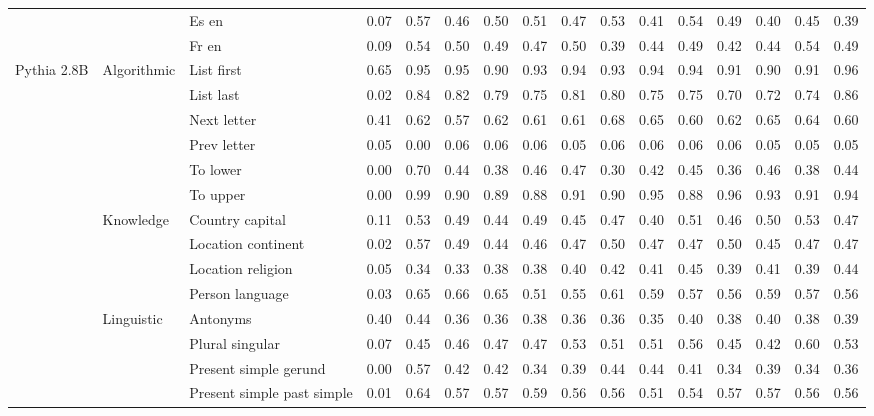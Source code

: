 \begin{center}
\begin{longtable}{lllrrrrrrrrrrrrr}
 &  & Es en & 0.07 & 0.57 & 0.46 & 0.50 & 0.51 & 0.47 & 0.53 & 0.41 & 0.54 & 0.49 & 0.40 & 0.45 & 0.39 \\
 &  & Fr en & 0.09 & 0.54 & 0.50 & 0.49 & 0.47 & 0.50 & 0.39 & 0.44 & 0.49 & 0.42 & 0.44 & 0.54 & 0.49 \\
\cline{1-16} \cline{2-16}
\multirow[t]{18}{*}{Pythia 2.8B} & \multirow[t]{6}{*}{Algorithmic} & List first & 0.65 & 0.95 & 0.95 & 0.90 & 0.93 & 0.94 & 0.93 & 0.94 & 0.94 & 0.91 & 0.90 & 0.91 & 0.96 \\
 &  & List last & 0.02 & 0.84 & 0.82 & 0.79 & 0.75 & 0.81 & 0.80 & 0.75 & 0.75 & 0.70 & 0.72 & 0.74 & 0.86 \\
 &  & Next letter & 0.41 & 0.62 & 0.57 & 0.62 & 0.61 & 0.61 & 0.68 & 0.65 & 0.60 & 0.62 & 0.65 & 0.64 & 0.60 \\
 &  & Prev letter & 0.05 & 0.00 & 0.06 & 0.06 & 0.06 & 0.05 & 0.06 & 0.06 & 0.06 & 0.06 & 0.05 & 0.05 & 0.05 \\
 &  & To lower & 0.00 & 0.70 & 0.44 & 0.38 & 0.46 & 0.47 & 0.30 & 0.42 & 0.45 & 0.36 & 0.46 & 0.38 & 0.44 \\
 &  & To upper & 0.00 & 0.99 & 0.90 & 0.89 & 0.88 & 0.91 & 0.90 & 0.95 & 0.88 & 0.96 & 0.93 & 0.91 & 0.94 \\
\cline{2-16}
 & \multirow[t]{4}{*}{Knowledge} & Country capital & 0.11 & 0.53 & 0.49 & 0.44 & 0.49 & 0.45 & 0.47 & 0.40 & 0.51 & 0.46 & 0.50 & 0.53 & 0.47 \\
 &  & Location continent & 0.02 & 0.57 & 0.49 & 0.44 & 0.46 & 0.47 & 0.50 & 0.47 & 0.47 & 0.50 & 0.45 & 0.47 & 0.47 \\
 &  & Location religion & 0.05 & 0.34 & 0.33 & 0.38 & 0.38 & 0.40 & 0.42 & 0.41 & 0.45 & 0.39 & 0.41 & 0.39 & 0.44 \\
 &  & Person language & 0.03 & 0.65 & 0.66 & 0.65 & 0.51 & 0.55 & 0.61 & 0.59 & 0.57 & 0.56 & 0.59 & 0.57 & 0.56 \\
\cline{2-16}
 & \multirow[t]{4}{*}{Linguistic} & Antonyms & 0.40 & 0.44 & 0.36 & 0.36 & 0.38 & 0.36 & 0.36 & 0.35 & 0.40 & 0.38 & 0.40 & 0.38 & 0.39 \\
 &  & Plural singular & 0.07 & 0.45 & 0.46 & 0.47 & 0.47 & 0.53 & 0.51 & 0.51 & 0.56 & 0.45 & 0.42 & 0.60 & 0.53 \\
 &  & Present simple gerund & 0.00 & 0.57 & 0.42 & 0.42 & 0.34 & 0.39 & 0.44 & 0.44 & 0.41 & 0.34 & 0.39 & 0.34 & 0.36 \\
 &  & Present simple past simple & 0.01 & 0.64 & 0.57 & 0.57 & 0.59 & 0.56 & 0.56 & 0.51 & 0.54 & 0.57 & 0.57 & 0.56 & 0.56 \\

\end{longtable}
\end{center}
